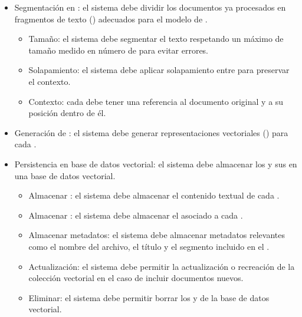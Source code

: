 \begin{itemize}
\begin{itemize}
		\begin{itemize}
		\tightlist
			\item {} Eliminar caracteres: el sistema debe eliminar los caracteres irrelevantes o problemáticos.
			\item {} Normalización: el sistema debe normalizar los espacios, saltos de línea y formatos inconsistentes.
		\end{itemize}
	\end{itemize}
	\item {} Segmentación en : el sistema debe dividir los documentos ya procesados en fragmentos de texto () adecuados para el modelo de .
	\begin{itemize}
	\tightlist
		\item {} Tamaño: el sistema debe segmentar el texto respetando un máximo de tamaño medido en número de  para evitar errores.
		\item {} Solapamiento: el sistema debe aplicar solapamiento entre  para preservar el contexto.
		\item {} Contexto: cada  debe tener una referencia al documento original y a su posición dentro de él.
	\end{itemize}
	\item {} Generación de : el sistema debe generar representaciones vectoriales () para cada .
	\item {} Persistencia en base de datos vectorial: el sistema debe almacenar los  y sus  en una base de datos vectorial.
	\begin{itemize}
	\tightlist
		\item {} Almacenar : el sistema debe almacenar el contenido textual de cada .
		\item {} Almacenar : el sistema debe almacenar el  asociado a cada .
		\item {} Almacenar metadatos: el sistema debe almacenar metadatos relevantes como el nombre del archivo, el título y el segmento incluido en el .
		\item {} Actualización: el sistema debe permitir la actualización o recreación de la colección vectorial en el caso de incluir documentos nuevos.
		\item {} Eliminar: el sistema debe permitir borrar los  y  de la base de datos vectorial.

\end{itemize}
\end{itemize}
